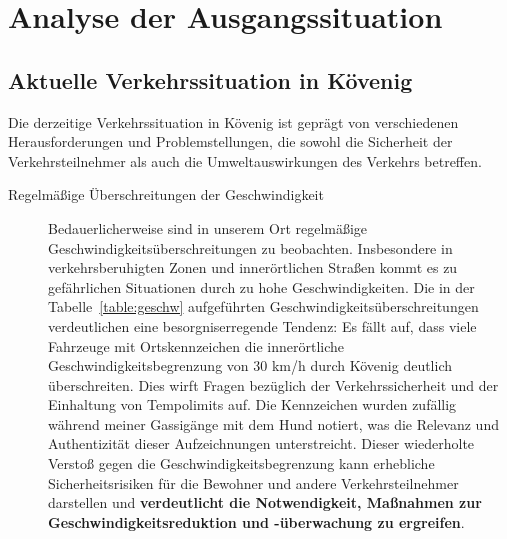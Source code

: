 	\section{Analyse der Ausgangssituation}
\subsection{Aktuelle Verkehrssituation in Kövenig}
  Die derzeitige Verkehrssituation in Kövenig ist geprägt von verschiedenen Herausforderungen und Problemstellungen, die sowohl die Sicherheit der Verkehrsteilnehmer als auch die Umweltauswirkungen des Verkehrs betreffen.
\begin{description}

  \item[Regelmäßige Überschreitungen der Geschwindigkeit]
  Bedauerlicherweise sind in unserem Ort regelmäßige Geschwindigkeitsüberschreitungen zu beobachten. Insbesondere in verkehrsberuhigten Zonen und innerörtlichen Straßen kommt es zu gefährlichen Situationen durch zu hohe Geschwindigkeiten. Die in der Tabelle~\ref{table:geschw} aufgeführten Geschwindigkeitsüberschreitungen verdeutlichen eine besorgniserregende Tendenz: Es fällt auf, dass viele Fahrzeuge mit Ortskennzeichen die innerörtliche Geschwindigkeitsbegrenzung von 30 km/h durch Kövenig deutlich überschreiten. Dies wirft Fragen bezüglich der Verkehrssicherheit und der Einhaltung von Tempolimits auf. Die Kennzeichen wurden zufällig während meiner Gassigänge mit dem Hund notiert, was die Relevanz und Authentizität dieser Aufzeichnungen unterstreicht. Dieser wiederholte Verstoß gegen die Geschwindigkeitsbegrenzung kann erhebliche Sicherheitsrisiken für die Bewohner und andere Verkehrsteilnehmer darstellen und \textbf{verdeutlicht die Notwendigkeit, Maßnahmen zur Geschwindigkeitsreduktion und -überwachung zu ergreifen}.




\end{description}
